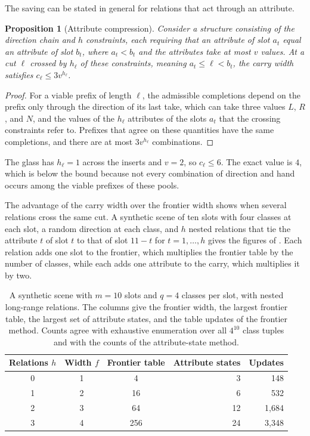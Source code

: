 \documentclass[11pt,twoside,openright]{book}
\theoremstyle{plain}
\newtheorem{proposition}[theorem]{Proposition}
\theoremstyle{definition}
\theoremstyle{remark}
\begin{document}
The saving can be stated in general for relations that act through an attribute.

\begin{proposition}[Attribute compression]\label{prop:attr}
Consider a structure consisting of the direction chain and $h$ constraints, each requiring that an attribute of slot $a_t$ equal an attribute of slot $b_t$, where $a_t<b_t$ and the attributes take at most $v$ values. At a cut $\ell$ crossed by $h_\ell$ of these constraints, meaning $a_t\le\ell<b_t$, the carry width satisfies $c_\ell\le3v^{h_\ell}$.
\end{proposition}

\begin{proof}
For a viable prefix of length $\ell$, the admissible completions depend on the prefix only through the direction of its last take, which can take three values $L$, $R$, and $N$, and the values of the $h_\ell$ attributes of the slots $a_t$ that the crossing constraints refer to. Prefixes that agree on these quantities have the same completions, and there are at most $3v^{h_\ell}$ combinations.
\end{proof}

The glass has $h_\ell=1$ across the inserts and $v=2$, so $c_\ell\le6$. The exact value is $4$, which is below the bound because not every combination of direction and hand occurs among the viable prefixes of these pools.

The advantage of the carry width over the frontier width shows when several relations cross the same cut. A synthetic scene of ten slots with four classes at each slot, a random direction at each class, and $h$ nested relations that tie the attribute $t$ of slot $t$ to that of slot $11-t$ for $t=1,\dots,h$ gives the figures of . Each relation adds one slot to the frontier, which multiplies the frontier table by the number of classes, while each adds one attribute to the carry, which multiplies it by two.

\begin{table}[ht]
\centering
\begin{tabular}{@{}cccrr@{}}
\toprule
Relations $h$ & Width $f$ & Frontier table & Attribute states & Updates\\
\midrule
0 & 1 & 4 & 3 & 148\\
1 & 2 & 16 & 6 & 532\\
2 & 3 & 64 & 12 & 1,684\\
3 & 4 & 256 & 24 & 3,348\\
\bottomrule
\end{tabular}
\caption{A synthetic scene with $m=10$ slots and $q=4$ classes per slot, with nested long-range relations. The columns give the frontier width, the largest frontier table, the largest set of attribute states, and the table updates of the frontier method. Counts agree with exhaustive enumeration over all $4^{10}$ class tuples and with the counts of the attribute-state method.}\label{tab:synthetic}
\end{table}
\end{document}
